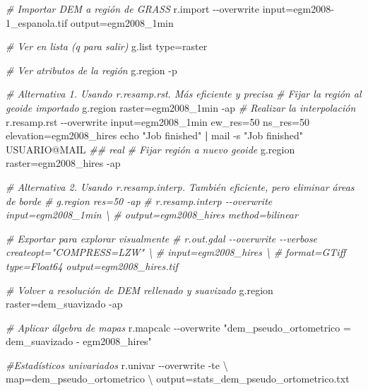 \documentclass[spanish]{article}
\newenvironment{Shaded}{\begin{snugshade}}{\end{snugshade}}
\newcommand{\AttributeTok}[1]{\textcolor[rgb]{0.77,0.63,0.00}{#1}}
\newcommand{\BuiltInTok}[1]{#1}
\newcommand{\CommentTok}[1]{\textcolor[rgb]{0.56,0.35,0.01}{\textit{#1}}}
\newcommand{\DataTypeTok}[1]{\textcolor[rgb]{0.13,0.29,0.53}{#1}}
\newcommand{\ExtensionTok}[1]{#1}
\newcommand{\KeywordTok}[1]{\textcolor[rgb]{0.13,0.29,0.53}{\textbf{#1}}}
\newcommand{\NormalTok}[1]{#1}
\newcommand{\StringTok}[1]{\textcolor[rgb]{0.31,0.60,0.02}{#1}}
\begin{document}
\begin{Shaded}
\begin{Highlighting}[]
\CommentTok{\# Importar DEM a región de GRASS}
\ExtensionTok{r.import} \AttributeTok{{-}{-}overwrite}\NormalTok{ input=egm2008{-}1\_espanola.tif output=egm2008\_1min}

\CommentTok{\# Ver en lista (q para salir)}
\ExtensionTok{g.list}\NormalTok{ type=raster}

\CommentTok{\# Ver atributos de la región}
\ExtensionTok{g.region} \AttributeTok{{-}p}

\CommentTok{\# Alternativa 1. Usando r.resamp.rst. Más eficiente y precisa}
\CommentTok{\# Fijar la región al geoide importado}
\ExtensionTok{g.region}\NormalTok{ raster=egm2008\_1min }\AttributeTok{{-}ap}
\CommentTok{\# Realizar la interpolación}
\ExtensionTok{r.resamp.rst} \AttributeTok{{-}{-}overwrite}\NormalTok{ input=egm2008\_1min ew\_res=50 ns\_res=50 elevation=egm2008\_hires}
\BuiltInTok{echo} \StringTok{"Job finished"} \KeywordTok{|} \ExtensionTok{mail} \AttributeTok{{-}s} \StringTok{"Job finished"}\NormalTok{ USUARIO@MAIL}
\CommentTok{\#\# real }
\CommentTok{\# Fijar región a nuevo geoide}
\ExtensionTok{g.region}\NormalTok{ raster=egm2008\_hires }\AttributeTok{{-}ap}

\CommentTok{\# Alternativa 2. Usando r.resamp.interp. También eficiente, pero eliminar áreas de borde}
\CommentTok{\# g.region res=50 {-}ap}
\CommentTok{\# r.resamp.interp {-}{-}overwrite input=egm2008\_1min \textbackslash{}}
\CommentTok{\#  output=egm2008\_hires method=bilinear}

\CommentTok{\# Exportar para explorar visualmente}
\CommentTok{\# r.out.gdal {-}{-}overwrite {-}{-}verbose createopt="COMPRESS=LZW" \textbackslash{}}
\CommentTok{\#  input=egm2008\_hires \textbackslash{}}
\CommentTok{\#  format=GTiff type=Float64 output=egm2008\_hires.tif}

\CommentTok{\# Volver a resolución de DEM rellenado y suavizado}
\ExtensionTok{g.region}\NormalTok{ raster=dem\_suavizado }\AttributeTok{{-}ap}

\CommentTok{\# Aplicar álgebra de mapas}
\ExtensionTok{r.mapcalc} \AttributeTok{{-}{-}overwrite} \StringTok{"dem\_pseudo\_ortometrico = dem\_suavizado {-} egm2008\_hires"}

\CommentTok{\#Estadísticos univariados}
\ExtensionTok{r.univar} \AttributeTok{{-}{-}overwrite} \AttributeTok{{-}te} \DataTypeTok{\textbackslash{}}
\NormalTok{  map=dem\_pseudo\_ortometrico }\DataTypeTok{\textbackslash{}}
\NormalTok{  output=stats\_dem\_pseudo\_ortometrico.txt}
\end{Highlighting}
\end{Shaded}
\end{document}

